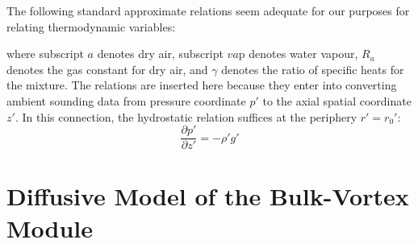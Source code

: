\documentclass[preprint, prX]{revtex4}
\newcommand{\pd}[2]{\frac{\partial#1}{\partial#2}}
\begin{document}
The following standard approximate relations seem adequate for our purposes for relating thermodynamic variables:

where subscript $a$ denotes dry air, subscript $va$p denotes water vapour, $R_a$ denotes the gas constant for dry air, and $\gamma$ denotes the ratio of specific heats for the mixture. The relations are inserted here because they enter into converting ambient sounding data from pressure coordinate $p'$ to the axial spatial coordinate $z'$. In this connection, the hydrostatic relation suffices at the periphery $r' = r_0'$:
\begin{equation}
\pd{p'}{z'} = -\rho' g'
\end{equation}

\section{Diffusive Model of the Bulk-Vortex Module}

\begin{figure}[h!]
	\centering
	\def\svgwidth{0.7\columnwidth}
	
\end{figure}
\end{document}

